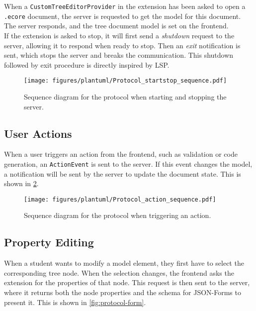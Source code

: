 When a \texttt{CustomTreeEditorProvider} in the extension has been asked to open a \texttt{.ecore} document, the server is requested to get the model for this document.
The server responds, and the tree document model is set on the frontend.\\

If the extension is asked to stop, it will first send a \textit{shutdown} request to the server, allowing it to respond when ready to stop.
Then an \textit{exit} notification is sent, which stops the server and breaks the communication.
This shutdown followed by exit procedure is directly inspired by \acrshort{LSP}.


\begin{figure}[htbp]  %
  \centering
  \texttt{[image: figures/plantuml/Protocol\_startstop\_sequence.pdf]}
  \caption[Protocol Sequence Diagram of Start/Stop and Document Opening]{Sequence diagram for the protocol when starting and stopping the server. \bluearrowDesc}\label{fig:protocol-startstop}
\end{figure}

\FloatBarrier

\subsection{User Actions}

When a user triggers an action from the frontend, such as validation or code generation, an \texttt{ActionEvent} is sent to the server.
If this event changes the model, a notification will be sent by the server to update the document state.
This is shown in \cref{fig:protocol-action}.

\begin{figure}[htbp]  %
  \centering
  \texttt{[image: figures/plantuml/Protocol\_action\_sequence.pdf]}
  \caption[Protocol Sequence Diagram of Action Triggering]{Sequence diagram for the protocol when triggering an action. \bluearrowDesc}\label{fig:protocol-action}
\end{figure}

\FloatBarrier

\subsection{Property Editing}

When a student wants to modify a model element, they first have to select the corresponding tree node.
When the selection changes, the frontend asks the extension for the properties of that node.
This request is then sent to the server, where it returns both the node properties and the schema for JSON-Forms to present it.
This is shown in \cref{fig:protocol-form}.\\

